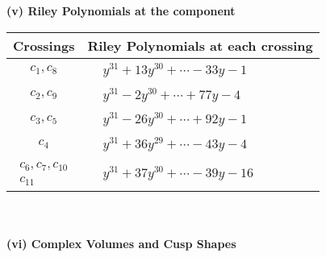 \documentclass[1p]{elsarticle_modified}
\theoremstyle{definition}
\begin{document}
\newpage\renewcommand{\arraystretch}{1}
\flushleft \textbf{(v) Riley Polynomials at the component}\newline \\
\begin{tabular}{m{50pt}|m{274pt}}
Crossings & \hspace{64pt}Riley Polynomials at each crossing \\
\hline $$\begin{aligned}c_{1},c_{8}\end{aligned}$$&$\begin{aligned}
&y^{31}+13 y^{30}+\cdots-33 y-1
\end{aligned}$\\
\hline $$\begin{aligned}c_{2},c_{9}\end{aligned}$$&$\begin{aligned}
&y^{31}-2 y^{30}+\cdots+77 y-4
\end{aligned}$\\
\hline $$\begin{aligned}c_{3},c_{5}\end{aligned}$$&$\begin{aligned}
&y^{31}-26 y^{30}+\cdots+92 y-1
\end{aligned}$\\
\hline $$\begin{aligned}c_{4}\end{aligned}$$&$\begin{aligned}
&y^{31}+36 y^{29}+\cdots-43 y-4
\end{aligned}$\\
\hline $$\begin{aligned}c_{6},c_{7},c_{10}\\c_{11}\end{aligned}$$&$\begin{aligned}
&y^{31}+37 y^{30}+\cdots-39 y-16
\end{aligned}$\\
\hline
\end{tabular}\\~\\
\newpage\flushleft \textbf{(vi) Complex Volumes and Cusp Shapes}
\end{document}
